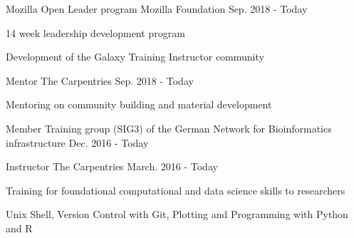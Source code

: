 

\begin{cventries}

  \cventry
    {Mozilla Open Leader program} %
    {Mozilla Foundation} %
    {} %
    {Sep. 2018 - Today} %
    {
      \begin{cvitems} %
        \item {14 week leadership development program}
        \item {Development of the Galaxy Training Instructor community}
      \end{cvitems}
    }

  \cventry
    {Mentor} %
    {The Carpentries} %
    {} %
    {Sep. 2018 - Today} %
    {
      \begin{cvitems} %
        \item {Mentoring on community building and material development}
      \end{cvitems}
    }

  \cventry
    {Member} %
    {Training group (SIG3) of the German Network for Bioinformatics infrastructure} %
    {} %
    {Dec. 2016 - Today} %
    {}

  \cventry
    {Instructor} %
    {The Carpentries} %
    {} %
    {March. 2016 - Today} %
    {
      \begin{cvitems} %
        \item {Training for foundational computational and data science skills to researchers}
        \item {Unix Shell, Version Control with Git, Plotting and Programming with Python and R}
      \end{cvitems}
    }



\end{cventries}
